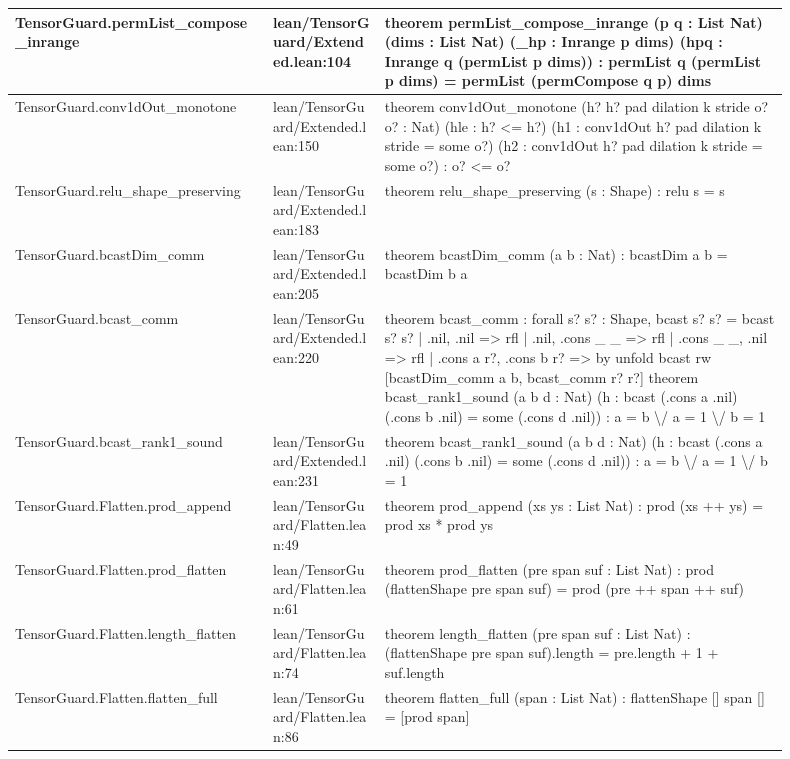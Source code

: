 \documentclass[10pt]{article}
\begin{document}
\begin{longtable}{|p{0.30\linewidth}|p{0.13\linewidth}|p{0.47\linewidth}|}
\hline
TensorGuard.permList\_compose\_inrange & lean/TensorGuard/Extended.lean:104 & theorem permList\_compose\_inrange (p q : List Nat) (dims : List Nat) (\_hp : Inrange p dims) (hpq : Inrange q (permList p dims)) : permList q (permList p dims) = permList (permCompose q p) dims \\
\hline
TensorGuard.conv1dOut\_monotone & lean/TensorGuard/Extended.lean:150 & theorem conv1dOut\_monotone (h? h? pad dilation k stride o? o? : Nat) (hle : h? <= h?) (h1 : conv1dOut h? pad dilation k stride = some o?) (h2 : conv1dOut h? pad dilation k stride = some o?) : o? <= o? \\
\hline
TensorGuard.relu\_shape\_preserving & lean/TensorGuard/Extended.lean:183 & theorem relu\_shape\_preserving (s : Shape) : relu s = s \\
\hline
TensorGuard.bcastDim\_comm & lean/TensorGuard/Extended.lean:205 & theorem bcastDim\_comm (a b : Nat) : bcastDim a b = bcastDim b a \\
\hline
TensorGuard.bcast\_comm & lean/TensorGuard/Extended.lean:220 & theorem bcast\_comm : forall s? s? : Shape, bcast s? s? = bcast s? s? | .nil, .nil => rfl | .nil, .cons \_ \_ => rfl | .cons \_ \_, .nil => rfl | .cons a r?, .cons b r? => by unfold bcast rw [bcastDim\_comm a b, bcast\_comm r? r?] theorem bcast\_rank1\_sound (a b d : Nat) (h : bcast (.cons a .nil) (.cons b .nil) = some (.cons d .nil)) : a = b \textbackslash{}/ a = 1 \textbackslash{}/ b = 1 \\
\hline
TensorGuard.bcast\_rank1\_sound & lean/TensorGuard/Extended.lean:231 & theorem bcast\_rank1\_sound (a b d : Nat) (h : bcast (.cons a .nil) (.cons b .nil) = some (.cons d .nil)) : a = b \textbackslash{}/ a = 1 \textbackslash{}/ b = 1 \\
\hline
TensorGuard.Flatten.prod\_append & lean/TensorGuard/Flatten.lean:49 & theorem prod\_append (xs ys : List Nat) : prod (xs ++ ys) = prod xs * prod ys \\
\hline
TensorGuard.Flatten.prod\_flatten & lean/TensorGuard/Flatten.lean:61 & theorem prod\_flatten (pre span suf : List Nat) : prod (flattenShape pre span suf) = prod (pre ++ span ++ suf) \\
\hline
TensorGuard.Flatten.length\_flatten & lean/TensorGuard/Flatten.lean:74 & theorem length\_flatten (pre span suf : List Nat) : (flattenShape pre span suf).length = pre.length + 1 + suf.length \\
\hline
TensorGuard.Flatten.flatten\_full & lean/TensorGuard/Flatten.lean:86 & theorem flatten\_full (span : List Nat) : flattenShape [] span [] = [prod span] \\

\end{longtable}
\end{document}
